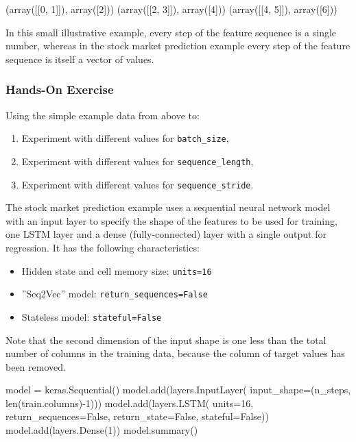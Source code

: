 \begin{samepage}
\begin{textcode}
(array([[0, 1]]), array([2]))
(array([[2, 3]]), array([4]))
(array([[4, 5]]), array([6]))
\end{textcode}
\end{samepage}

In this small illustrative example, every step of the feature sequence is a single number, whereas in the stock market prediction example every step of the feature sequence is itself a vector of values.


\begin{tcolorbox}[colback=code]
\subsubsection*{Hands-On Exercise} 
Using the simple example data from above to:
\begin{enumerate}
   \item Experiment with different values for \texttt{batch\_size},
   \item Experiment with different values for \texttt{sequence\_length},
   \item Experiment with different values for \texttt{sequence\_stride}.
\end{enumerate}
\end{tcolorbox}

The stock market prediction example uses a sequential neural network model with an input layer to specify the shape of the features to be used for training, one LSTM layer and a dense (fully-connected) layer with a single output for regression. It has the following characteristics:

\begin{itemize}
   \item Hidden state and cell memory size: \texttt{units=16}
   \item ''Seq2Vec'' model: \texttt{return\_sequences=False}
   \item Stateless model: \texttt{stateful=False}
\end{itemize}

Note that the second dimension of the input shape is one less than the total number of columns in the training data, because the column of target values has been removed.

\begin{samepage}
\begin{pythoncode}
model = keras.Sequential()
model.add(layers.InputLayer(
    input_shape=(n_steps, len(train.columns)-1)))
model.add(layers.LSTM(
    units=16,
    return_sequences=False,
    return_state=False,
    stateful=False))
model.add(layers.Dense(1))
model.summary()
\end{pythoncode}
\end{samepage}

